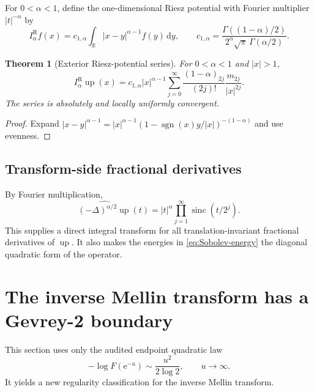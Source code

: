 \documentclass[11pt]{article}
\newtheorem{theorem}{Theorem}[section]
\theoremstyle{definition}
\theoremstyle{remark}
\newcommand{\R}{\mathbb R}
\newcommand{\dd}{\,\mathrm d}
\newcommand{\e}{\mathrm e}
\newcommand{\Up}{\operatorname{up}}
\newcommand{\sinc}{\operatorname{sinc}}
\newcommand{\poch}[2]{(#1)_{#2}}
\DeclareMathOperator{\sgn}{sgn}
\begin{document}
For $0<\alpha<1$, define the one-dimensional Riesz potential with Fourier multiplier
$|t|^{-\alpha}$ by
\begin{equation}
 I_\alpha^{\mathrm R}f(x)
 =c_{1,\alpha}\int_{\R}|x-y|^{\alpha-1}f(y)\dd y,
 \qquad
 c_{1,\alpha}=
 \frac{\Gamma((1-\alpha)/2)}{2^\alpha\sqrt\pi\,\Gamma(\alpha/2)}.
 \label{eq:Riesz-potential-def}
\end{equation}

\begin{theorem}[Exterior Riesz-potential series]
\label{thm:Riesz-potential-tail}
For $0<\alpha<1$ and $|x|>1$,
\begin{equation}
 I_\alpha^{\mathrm R}\Up(x)
 =c_{1,\alpha}|x|^{\alpha-1}
 \sum_{j=0}^{\infty}
 \frac{\poch{1-\alpha}{2j}}{(2j)!}
 \frac{m_{2j}}{|x|^{2j}}.
 \label{eq:Riesz-potential-tail}
\end{equation}
The series is absolutely and locally uniformly convergent.
\end{theorem}

\begin{proof}
Expand
$|x-y|^{\alpha-1}=|x|^{\alpha-1}(1-\sgn(x)y/|x|)^{-(1-\alpha)}$ and use evenness.
\end{proof}

\subsection{Transform-side fractional derivatives}

By Fourier multiplication,
\begin{equation}
 \widehat{(-\Delta)^{\alpha/2}\Up}(t)
 =|t|^\alpha\prod_{j=1}^{\infty}\sinc(t/2^j).
 \label{eq:Riesz-transform-up}
\end{equation}
This supplies a direct integral transform for all translation-invariant fractional derivatives
of $\Up$.  It also makes the energies in \cref{eq:Sobolev-energy} the diagonal quadratic form
of the operator.

\section{The inverse Mellin transform has a Gevrey-2 boundary}
\label{sec:Gevrey}

This section uses only the audited endpoint quadratic law
\begin{equation}
 -\log F(\e^{-u})\sim\frac{u^2}{2\log2},\qquad u\to\infty.
 \label{eq:endpoint-quadratic-u}
\end{equation}
It yields a new regularity classification for the inverse Mellin transform.
\end{document}
